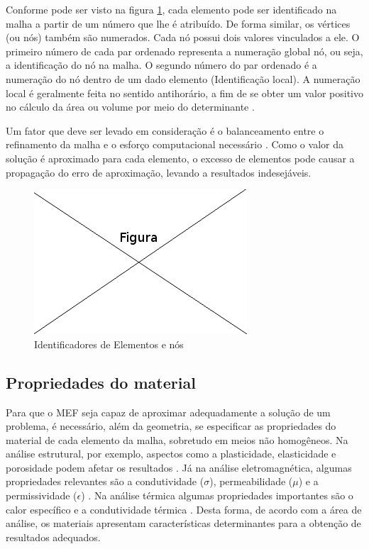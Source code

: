 \documentclass[
    12pt,               %
    openright,          %
    oneside,
    a4paper,            %
    english,            %
    french,             %
    spanish,            %
    brazil              %
    ]{abntex2}
\begin{document}
Conforme pode ser visto na figura \ref{fig:numeracao}, cada elemento pode ser identificado na malha a partir de um número que lhe é atribuído. De forma similar, os vértices (ou nós) também são numerados. Cada nó possui dois valores vinculados a ele. 
O primeiro número de cada par ordenado representa a numeração global nó, ou seja, a identificação do nó na malha. O segundo número do par ordenado é a numeração do nó dentro de um dado elemento (Identificação local). A numeração local é geralmente feita no sentido antihorário, a fim de se obter um valor positivo no cálculo da área ou volume por meio do  determinante \cite[p. 394]{sadiku} \cite[p. 95]{jin}. 

Um fator que deve ser levado em consideração é o balanceamento entre o refinamento da malha e o esforço computacional necessário \cite[p. 154]{desai}. Como o valor da solução é aproximado para cada elemento, o excesso de elementos pode causar a propagação do erro de aproximação, levando a resultados indesejáveis.


\begin{figure}[!htb]
\centering
\includegraphics[scale=0.5]{figuras/temp.png}
\caption{Identificadores de Elementos e nós}
\label{fig:numeracao}
\end{figure}

\subsection{Propriedades do material}
Para que o MEF seja capaz de aproximar adequadamente a solução de um problema, é necessário, além da geometria, se especificar as propriedades do material de cada elemento da malha, sobretudo em meios não homogêneos. Na análise estrutural, por exemplo, aspectos como a plasticidade, elasticidade e porosidade podem afetar os resultados \cite[p. 250]{desai}. Já na análise eletromagnética, algumas propriedades relevantes são a condutividade ($\sigma$), permeabilidade ($\mu$) e a permissividade ($\epsilon$) \cite[p. 3]{volakis}. Na análise térmica algumas propriedades importantes são o calor específico e a condutividade térmica \cite[p. 251]{desai}.
Desta forma, de acordo com a área de análise, os materiais apresentam características determinantes para a obtenção de resultados adequados.
\end{document}
